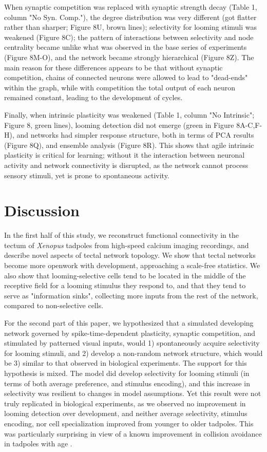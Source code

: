 \documentclass{article}
\begin{document}
When synaptic competition was replaced with synaptic strength decay (Table 1, column "No Syn. Comp."), the degree distribution was very different (got flatter rather than sharper; Figure 8U, brown lines); selectivity for looming stimuli was weakened (Figure 8C); the pattern of interactions between selectivity and node centrality became unlike what was observed in the base series of experiments (Figure 8M-O), and the network became strongly hierarchical (Figure 8Z). The main reason for these differences appears to be that without synaptic competition, chains of connected neurons were allowed to lead to "dead-ends" within the graph, while with competition the total output of each neuron remained constant, leading to the development of cycles. 

Finally, when intrinsic plasticity was weakened (Table 1, column "No Intrinsic"; Figure 8, green lines), looming detection did not emerge (green in Figure 8A-C,F-H), and networks had simpler response structure, both in terms of PCA results (Figure 8Q), and ensemble analysis (Figure 8R). This shows that agile intrinsic plasticity is critical for learning; without it the interaction between neuronal activity and network connectivity is disrupted, as the network cannot process sensory stimuli, yet is prone to spontaneous activity.

\section*{Discussion}

In the first half of this study, we reconstruct functional connectivity in the tectum of \textit{Xenopus} tadpoles from high-speed calcium imaging recordings, and describe novel aspects of tectal network topology. We show that tectal networks become more openwork with development, approaching a scale-free statistics. We also show that looming-selective cells tend to be located in the middle of the receptive field for a looming stimulus they respond to, and that they tend to serve as "information sinks", collecting more inputs from the rest of the network, compared to non-selective cells.

For the second part of this paper, we hypothesized that a simulated developing network governed by spike-time-dependent plasticity, synaptic competition, and stimulated by patterned visual inputs, would 1) spontaneously acquire selectivity for looming stimuli, and 2) develop a non-random network structure, which would be 3) similar to that observed in biological experiments. The support for this hypothesis is mixed. The model did develop selectivity for looming stimuli (in terms of both average preference, and stimulus encoding), and this increase in selectivity was resilient to changes in model assumptions. Yet this result were not truly replicated in biological experiments, as we observed no improvement in looming detection over development, and neither average selectivity, stimulus encoding, nor cell specialization improved from younger to older tadpoles. This was particularly surprising in view of a known improvement in collision avoidance in tadpoles with age \citep{dong2009}.
\end{document}
